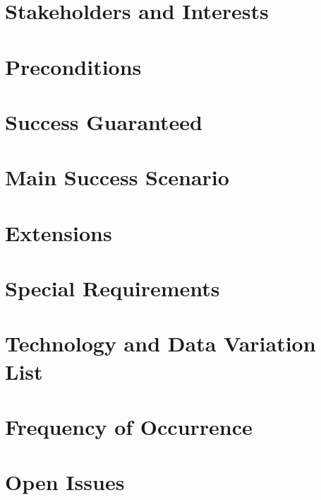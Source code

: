 \documentclass[11pt,a4paper]{article}
\begin{document}
\section{Stakeholders and Interests}
\section{Preconditions}
\section{Success Guaranteed}
\section{Main Success Scenario}
\subsection{}
\subsection{}
\section{Extensions}
\subsection{}
\subsection{}
\section{Special Requirements}
\section{Technology and Data Variation List}
\section{Frequency of Occurrence}
\section{Open Issues}
\end{document}
